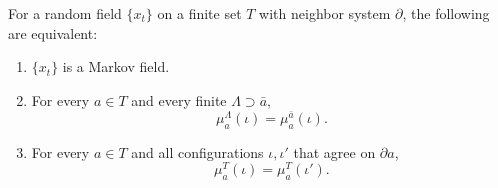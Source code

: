 For a random field $\{x_t\}$ on a finite set $T$ with neighbor system $\partial$, the following are equivalent:
\begin{enumerate}
\item[(1)] $\{x_t\}$ is a Markov field.
\item[(2)] For every $a \in T$ and every finite $\Lambda \supset \bar{a}$,
$$\mu_a^\Lambda(\iota) = \mu_a^{\bar{a}}(\iota).$$
\item[(3)] For every $a \in T$ and all configurations $\iota, \iota'$ that agree on $\partial a$,
$$\mu_a^T(\iota) = \mu_a^T(\iota').$$
\end{enumerate}

